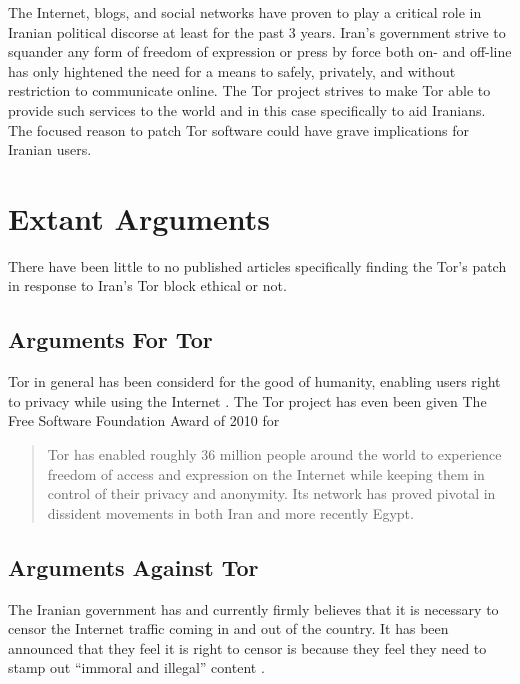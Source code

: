 \documentclass[11pt]{article}
\begin{document}
\begin{multicols}{2}
The Internet, blogs, and social networks have proven to play a critical role in
Iranian political discorse at least for the past 3 years. Iran's government
strive to squander any form of freedom of expression or press by force both on-
and off-line has only hightened the need for a means to safely, privately, and
without restriction to communicate online. The Tor project strives to make Tor
able to provide such services to the world and in this case specifically to aid
Iranians. The focused reason to patch Tor software could have grave implications
for Iranian users.

\section{Extant Arguments} 

There have been little to no published articles specifically finding the Tor's
patch in response to Iran's Tor block ethical or not.

\subsection{Arguments For Tor}

Tor in general has been considerd for the good of humanity, enabling users right
to privacy while using the Internet \cite{TorCreatesSaferInternet, TorLastHope}.
The Tor project has even been given The Free Software Foundation Award of 2010
for \begin{quotation}Tor has enabled roughly 36 million people around the world
  to experience freedom of access and expression on the Internet while keeping
  them in control of their privacy and anonymity. Its network has proved pivotal
in dissident movements in both Iran and more recently
Egypt.\cite{FreeSoftwareAwards} \end{quotation}



\subsection{Arguments Against Tor}

The Iranian government has and currently firmly believes that it is necessary to
censor the Internet traffic coming in and out of the country. It has been
announced that they feel it is right to censor is because they feel they need to
stamp out ``immoral and illegal'' content \cite{CensorshipFearsRise}.


\end{multicols}
\end{document}
